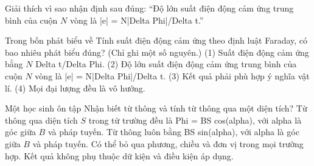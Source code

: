 \begin{bt}
Giải thích vì sao nhận định sau đúng: “Độ lớn suất điện động cảm ứng trung bình của cuộn $N$ vòng là |e| = N|Delta Phi|/Delta t.”
\end{bt}

\begin{ex}
Trong bốn phát biểu về Tính suất điện động cảm ứng theo định luật Faraday, có bao nhiêu phát biểu đúng? (Chỉ ghi một số nguyên.) (1) Suất điện động cảm ứng bằng $N$ Delta t/Delta Phi. (2) Độ lớn suất điện động cảm ứng trung bình của cuộn $N$ vòng là |e| = N|Delta Phi|/Delta t. (3) Kết quả phải phù hợp ý nghĩa vật lí. (4) Mọi đại lượng đều là vô hướng.
\end{ex}

\begin{ex}
Một học sinh ôn tập Nhận biết từ thông và tính từ thông qua một diện tích?
\choice
{\True Từ thông qua diện tích $S$ trong từ trường đều là Phi = BS cos(alpha), với alpha là góc giữa $B$ và pháp tuyến.}
{Từ thông luôn bằng BS sin(alpha), với alpha là góc giữa $B$ và pháp tuyến.}
{Có thể bỏ qua phương, chiều và đơn vị trong mọi trường hợp.}
{Kết quả không phụ thuộc dữ kiện và điều kiện áp dụng.}
\end{ex}

